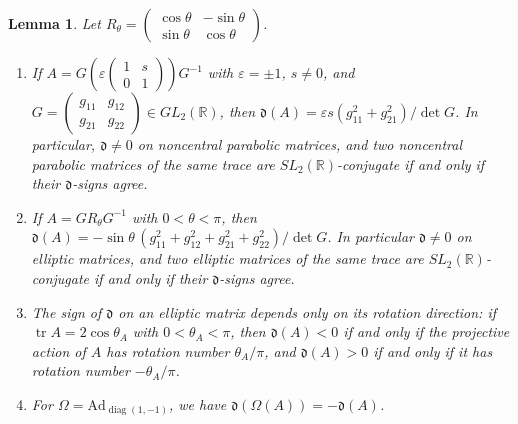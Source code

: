 \documentclass{article}
\theoremstyle{plain}
\theoremstyle{definition}
\theoremstyle{plain}
\theoremstyle{plain}
\theoremstyle{plain}
\newtheorem{lemma}[theorem]{Lemma}
\theoremstyle{remark}
\theoremstyle{remark}
\theoremstyle{plain}
\theoremstyle{plain}
\theoremstyle{plain}
\theoremstyle{plain}
\begin{document}
\begin{lemma}\label{lma:realformsign}
Let $R_\theta = \left(\begin{smallmatrix}\cos\theta & -\sin\theta \\ \sin\theta & \cos\theta\end{smallmatrix}\right)$.
\begin{enumerate}
	\item If $A = G(\varepsilon \left(\begin{smallmatrix}1&s\\0&1\end{smallmatrix}\right))G^{-1}$ with $\varepsilon = \pm 1$, $s \neq 0$, and $G = \left(\begin{smallmatrix} g_{11} & g_{12} \\ g_{21} & g_{22} \end{smallmatrix}\right) \in GL_2(\mathbb{R})$, then $\mathfrak{d}(A) = \varepsilon s(g_{11}^2 + g_{21}^2)/\det G$. In particular, $\mathfrak{d} \neq 0$ on noncentral parabolic matrices, and two noncentral parabolic matrices of the same trace are $SL_2(\mathbb{R})$-conjugate if and only if their $\mathfrak{d}$-signs agree.
	\item If $A = GR_\theta G^{-1}$ with $0 < \theta < \pi$, then $\mathfrak{d}(A) = -\sin\theta\,(g_{11}^2 + g_{12}^2 + g_{21}^2 + g_{22}^2)/\det G$. In particular $\mathfrak{d} \neq 0$ on elliptic matrices, and two elliptic matrices of the same trace are $SL_2(\mathbb{R})$-conjugate if and only if their $\mathfrak{d}$-signs agree.
	\item The sign of $\mathfrak{d}$ on an elliptic matrix depends only on its rotation direction: if $\operatorname{tr} A = 2\cos\theta_A$ with $0 < \theta_A < \pi$, then $\mathfrak{d}(A) < 0$ if and only if the projective action of $A$ has rotation number $\theta_A/\pi$, and $\mathfrak{d}(A) > 0$ if and only if it has rotation number $-\theta_A/\pi$.
	\item For $\Omega = \mathrm{Ad}_{\operatorname{diag}(1,-1)}$, we have $\mathfrak{d}(\Omega(A)) = -\mathfrak{d}(A)$.
\end{enumerate}
\end{lemma}
\end{document}
